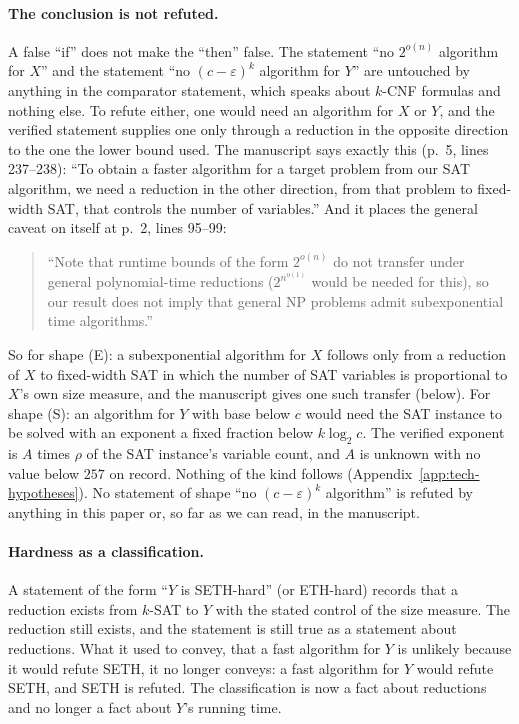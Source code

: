 \paragraph{The conclusion is not refuted.}
A false ``if'' does not make the ``then'' false. The statement ``no
$2^{o(n)}$ algorithm for $X$'' and the statement ``no
$(c-\varepsilon)^k$ algorithm for $Y$'' are untouched by anything in the
comparator statement, which speaks about $k$-CNF formulas and nothing
else. To refute either, one would need an algorithm for $X$ or $Y$, and
the verified statement supplies one only through a reduction in the
opposite direction to the one the lower bound used. The manuscript says
exactly this (p.~5, lines 237--238): ``To obtain a faster algorithm for
a target problem from our SAT algorithm, we need a reduction in the
other direction, from that problem to fixed-width SAT, that controls the
number of variables.'' And it places the general caveat on itself at
p.~2, lines 95--99:
\begin{quote}\small
``Note that runtime bounds of the form $2^{o(n)}$ do not transfer under
general polynomial-time reductions ($2^{n^{o(1)}}$ would be needed for
this), so our result does not imply that general NP problems admit
subexponential time algorithms.''
\end{quote}
So for shape (E): a subexponential algorithm for $X$ follows only from a
reduction of $X$ to fixed-width SAT in which the number of SAT variables
is proportional to $X$'s own size measure, and the manuscript gives one
such transfer (below). For shape (S): an algorithm for $Y$ with base below $c$ would need the SAT instance to be solved with an exponent a fixed fraction below $k \log_2 c$. The verified exponent is $A$ times $\rho$ of the SAT
instance's variable count, and $A$ is unknown with no value below $257$
on record. Nothing of the kind follows (Appendix~\ref{app:tech-hypotheses}). No
statement of shape ``no $(c-\varepsilon)^k$ algorithm'' is refuted by
anything in this paper or, so far as we can read, in the manuscript.

\paragraph{Hardness as a classification.}
A statement of the form ``$Y$ is SETH-hard'' (or ETH-hard) records that
a reduction exists from $k$-SAT to $Y$ with the stated control of the
size measure. The reduction still exists, and the statement is still
true as a statement about reductions. What it used to convey, that a
fast algorithm for $Y$ is unlikely because it would refute SETH, it no
longer conveys: a fast algorithm for $Y$ would refute SETH, and SETH is
refuted. The classification is now a fact about reductions and no
longer a fact about $Y$'s running time.

